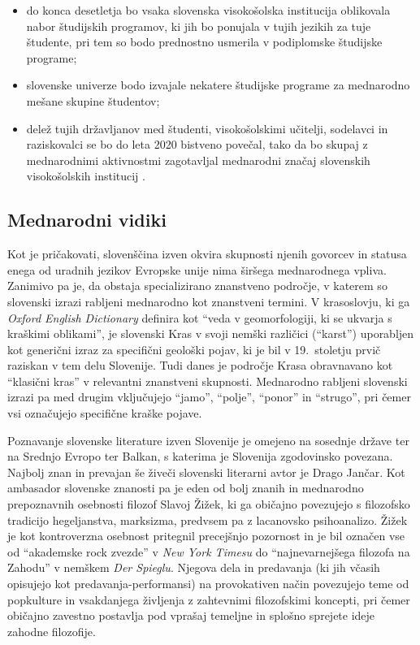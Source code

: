 \begin{multicols}{2}
\begin{itemize}
\item do konca desetletja bo vsaka slovenska visokošolska institucija oblikovala nabor študijskih programov, ki jih bo ponujala v tujih jezikih za tuje študente, pri tem so bodo prednostno usmerila v podiplomske študijske programe;
\item slovenske univerze bodo izvajale nekatere študijske programe za mednarodno mešane skupine študentov;
\item delež tujih držav\-ljanov med študenti, visokošolskimi učitelji, sodelavci in raziskovalci se bo do leta 2020 bistveno povečal, tako da bo skupaj z mednarodnimi aktivnostmi zagotav\-ljal mednarodni značaj slovenskih visokošolskih institucij \cite{UradniList1}.
\end{itemize}

\subsection{Mednarodni vidiki}

Kot je pričakovati, slovenščina izven okvira skupnosti njenih go\-vorcev in statusa enega od uradnih jezikov Evropske unije nima širšega mednarodnega vpliva. Zanimivo pa je, da obstaja specializirano znanstveno področje, v katerem so slovenski izrazi rab\-ljeni mednarodno kot znanstveni termini. V krasoslovju, ki ga \textit{Oxford English Dictionary} definira kot “veda v geomorfologiji, ki se ukvarja s kraškimi oblikami”, je slovenski Kras v svoji nemški različici (“karst”) uporab\-ljen kot generični izraz za specifični geološki pojav, ki je bil v 19.~stoletju prvič raziskan v tem delu Slovenije. Tudi danes je področje Krasa obravnavano kot “klasični kras” v rele\-vantni znanstveni skupnosti. Mednarodno rab\-ljeni slovenski izrazi pa med drugim vključujejo “jamo”, “polje”, “ponor” in “strugo”, pri čemer vsi označujejo specifične kraške pojave.

Poznavanje slovenske literature izven Slovenije je omejeno na sosednje države ter na Srednjo Evropo ter Balkan, s katerima je Slovenija zgodovinsko povezana. Naj\-bolj znan in prevajan še živeči slovenski literarni avtor je Drago Jančar. Kot ambasador slovenske znanosti pa je eden od bolj znanih in mednarodno prepoznavnih osebnosti filozof Slavoj Žižek, ki ga običajno povezujejo s filozofsko tradicijo hegeljanstva, marksizma, predvsem pa z lacanovsko psihoanalizo. Žižek je kot kontroverzna osebnost pritegnil precejšnjo pozornost in je bil označen vse od “akademske rock zvezde” v \textit{New York Timesu} do “naj\-nevarnejšega filozofa na Zahodu” v nemškem \textit{Der Spieglu}. Njegova dela in predavanja (ki jih včasih opisujejo kot predavanja-performansi) na provokativen način povezujejo teme od popkulture in vsakdanjega živ\-ljenja z zah\-tevnimi filozofskimi koncepti, pri čemer običajno zavestno postav\-lja pod vprašaj temeljne in splošno sprejete ideje zahodne filozofije.


\end{multicols}
